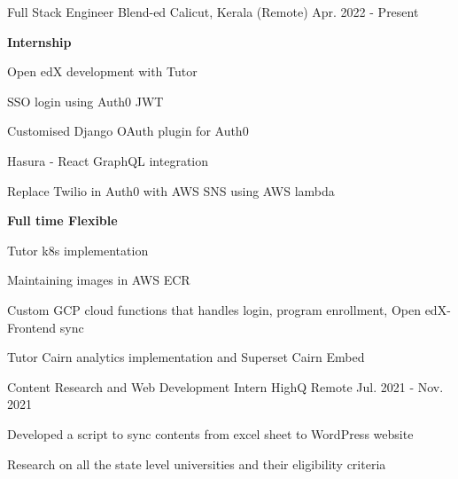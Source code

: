 
\begin{cventries}
  \cventry
    {Full Stack Engineer} %
    {Blend-ed} %
    {Calicut, Kerala (Remote)   } %
    {Apr. 2022 - Present} %
    {
      \begin{cvitems} %
        \item \textbf{Internship}
        \item Open edX development with Tutor
        \item SSO login using Auth0 JWT
        \item Customised Django OAuth plugin for Auth0
        \item Hasura - React GraphQL integration
        \item Replace Twilio in Auth0 with AWS SNS using AWS lambda
        \vspace{2mm}
        \item \textbf{Full time Flexible}
        \item Tutor k8s implementation
        \item Maintaining images in AWS ECR
        \item Custom GCP cloud functions that handles login, program enrollment, Open edX-Frontend sync
        \item Tutor Cairn analytics implementation and Superset Cairn Embed
      \end{cvitems}
    }

  \cventry
    {Content Research and Web Development Intern} %
    {HighQ} %
    {Remote} %
    {Jul. 2021 - Nov. 2021} %
    {
      \begin{cvitems} %
        \item Developed a script to sync contents from excel sheet to WordPress website
        \item Research on all the state level universities and their eligibility criteria
      \end{cvitems}
    }
    
\end{cventries}
